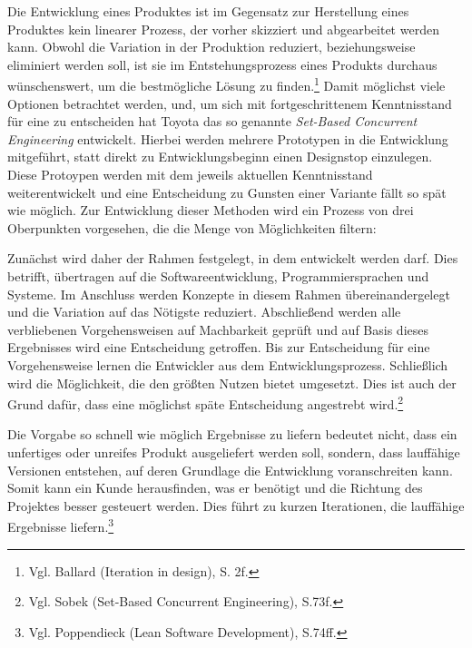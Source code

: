             Die Entwicklung eines Produktes ist im Gegensatz zur Herstellung eines Produktes kein linearer Prozess, der vorher skizziert und abgearbeitet werden kann. Obwohl die Variation in der Produktion reduziert, beziehungsweise eliminiert werden soll, ist sie im Entstehungsprozess eines Produkts durchaus wünschenswert, um die bestmögliche Lösung zu finden.\footnote{Vgl. Ballard (Iteration in design), S. 2f.} Damit möglichst viele Optionen betrachtet werden, und, um sich mit fortgeschrittenem Kenntnisstand für eine zu entscheiden hat Toyota das so genannte \emph{Set-Based Concurrent Engineering} entwickelt. Hierbei werden mehrere Prototypen in die Entwicklung mitgeführt, statt direkt zu Entwicklungsbeginn einen Designstop einzulegen. Diese Protoypen werden mit dem jeweils aktuellen Kenntnisstand weiterentwickelt und eine Entscheidung zu Gunsten einer Variante fällt so spät wie möglich. Zur Entwicklung dieser Methoden wird ein Prozess von drei Oberpunkten vorgesehen, die die Menge von Möglichkeiten filtern:


            Zunächst wird daher der Rahmen festgelegt, in dem entwickelt werden darf. Dies betrifft, übertragen auf die Softwareentwicklung, Programmiersprachen und Systeme. Im Anschluss werden Konzepte in diesem Rahmen übereinandergelegt und die Variation auf das Nötigste reduziert. Abschließend werden alle verbliebenen Vorgehensweisen auf Machbarkeit geprüft und auf Basis dieses Ergebnisses wird eine Entscheidung getroffen. Bis zur Entscheidung für eine Vorgehensweise lernen die Entwickler aus dem Entwicklungsprozess. Schließlich wird die Möglichkeit, die den größten Nutzen bietet umgesetzt. Dies ist auch der Grund dafür, dass eine möglichst späte Entscheidung angestrebt wird.\footnote{Vgl. Sobek (Set-Based Concurrent Engineering), S.73f.}

            Die Vorgabe so schnell wie möglich Ergebnisse zu liefern bedeutet nicht, dass ein unfertiges oder unreifes Produkt ausgeliefert werden soll, sondern, dass lauffähige Versionen entstehen, auf deren Grundlage die Entwicklung voranschreiten kann. Somit kann ein Kunde herausfinden, was er benötigt und die Richtung des Projektes besser gesteuert werden. Dies führt zu kurzen Iterationen, die lauffähige Ergebnisse liefern.\footnote{Vgl. Poppendieck (Lean Software Development), S.74ff.}


